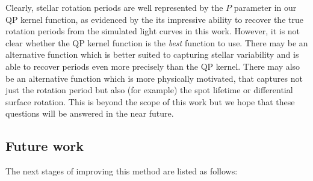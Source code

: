 Clearly, stellar rotation periods are well represented by the $P$ parameter in
our QP kernel function, as evidenced by the its impressive ability to recover
the true rotation periods from the simulated light curves in this work.
However, it is not clear whether the QP kernel function is the {\it best}
function to use.
There may be an alternative function which is better suited to capturing
stellar variability and is able to recover periods even more precisely than
the QP kernel.
There may also be an alternative function which is more physically motivated,
that captures not just the rotation period but also (for example) the spot
lifetime or differential surface rotation.
This is beyond the scope of this work but we hope that these questions will be
answered in the near future.

\subsection{Future work}
The next stages of improving this method are listed as follows:
